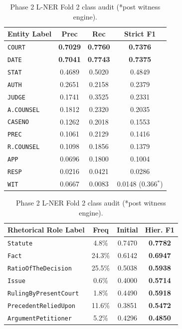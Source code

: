 \documentclass[11pt, oneside]{article}
\renewcommand{\arraystretch}{0.85}
\begin{document}
\begin{table}[htbp]
\centering
\scriptsize
\renewcommand{\arraystretch}{0.74}
\begin{minipage}[t]{0.48\textwidth}
\centering
\begin{tabular}{lccc}
\toprule
Entity Label & Prec & Rec & Strict F1 \\
\midrule
\texttt{COURT} & \textbf{0.7029} & \textbf{0.7760} & \textbf{0.7376} \\
\texttt{DATE} & \textbf{0.7041} & \textbf{0.7743} & \textbf{0.7375} \\
\texttt{STAT} & 0.4689 & 0.5020 & 0.4849 \\
\texttt{AUTH} & 0.2651 & 0.2158 & 0.2379 \\
\texttt{JUDGE} & 0.1741 & 0.3525 & 0.2331 \\
\texttt{A.COUNSEL} & 0.1812 & 0.2320 & 0.2035 \\
\texttt{CASENO} & 0.1262 & 0.2018 & 0.1553 \\
\texttt{PREC} & 0.1061 & 0.2129 & 0.1416 \\
\texttt{R.COUNSEL} & 0.1098 & 0.1856 & 0.1379 \\
\texttt{APP} & 0.0696 & 0.1800 & 0.1004 \\
\texttt{RESP} & 0.0216 & 0.0421 & 0.0286 \\
\texttt{WIT} & 0.0667 & 0.0083 & 0.0148 (0.366$^*$) \\
\bottomrule
\end{tabular}
\caption{Phase 2 L-NER Fold 2 class audit (*post witness engine).}
\label{tab:p2_classes}
\end{minipage}\hfill
\begin{minipage}[t]{0.50\textwidth}
\centering
\begin{tabular}{lccc}
\toprule
Rhetorical Role Label & Freq & Initial & Hier. F1 \\
\midrule
\texttt{Statute} & 4.8\% & 0.7470 & \textbf{0.7782} \\
\texttt{Fact} & 24.3\% & 0.6142 & \textbf{0.6947} \\
\texttt{RatioOfTheDecision} & 25.5\% & 0.5038 & \textbf{0.5938} \\
\texttt{Issue} & 0.6\% & 0.4000 & \textbf{0.5714} \\
\texttt{RulingByPresentCourt} & 1.8\% & 0.4490 & \textbf{0.5918} \\
\texttt{PrecedentReliedUpon} & 11.6\% & 0.3851 & \textbf{0.5472} \\
\texttt{ArgumentPetitioner} & 5.2\% & 0.4296 & \textbf{0.4850} \\

\end{tabular}
\end{minipage}
\end{table}
\end{document}
